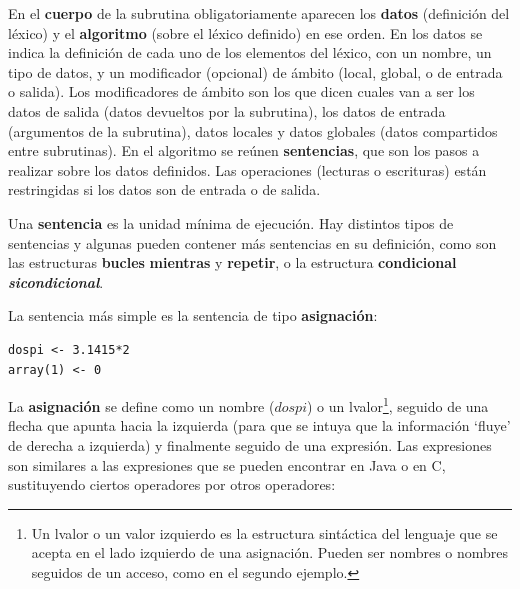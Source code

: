 \documentclass{report}
\begin{document}
	En el \textbf{cuerpo} de la subrutina obligatoriamente aparecen los \textbf{datos} (definición del léxico) y el \textbf{algoritmo} (sobre el léxico definido) en ese orden. En los datos se indica la definición de cada uno de los elementos del léxico, con un nombre, un tipo de datos, y un modificador (opcional) de ámbito (local, global, o de entrada o salida). Los modificadores de ámbito son los que dicen cuales van a ser los datos de salida (datos devueltos por la subrutina), los datos de entrada (argumentos de la subrutina), datos locales y datos globales (datos compartidos entre subrutinas). En el algoritmo se reúnen \textbf{sentencias}, que son los pasos a realizar sobre los datos definidos. Las operaciones (lecturas o escrituras) están restringidas si los datos son de entrada o de salida.   
	
	\vspace{10px}
	
	Una \textbf{sentencia} es la unidad mínima de ejecución. Hay distintos tipos de sentencias y algunas pueden contener más sentencias en su definición, como son las estructuras \textbf{bucles} \textbf{mientras} y \textbf{repetir}, o la estructura \textbf{condicional} \textbf{\textit{sicondicional}}. 
	
	\vspace{10px}
	
	La sentencia más simple es la sentencia de tipo \textbf{asignación}:
	
	\vspace{10px}
	
\begin{BVerbatim}
dospi <- 3.1415*2
array(1) <- 0
\end{BVerbatim}
	
	\vspace{10px}
	
	La \textbf{asignación} se define como un nombre ($dospi$) o un lvalor\footnote{Un lvalor o un valor izquierdo es la estructura sintáctica del lenguaje que se acepta en el lado izquierdo de una asignación. Pueden ser nombres o nombres seguidos de un acceso, como en el segundo ejemplo.}, seguido de una flecha que apunta hacia la izquierda (para que se intuya que la información `fluye' de derecha a izquierda) y finalmente seguido de una expresión. Las expresiones son similares a las expresiones que se pueden encontrar en Java o en C, sustituyendo ciertos operadores por otros operadores:
	
	\vspace{10px}
	
\end{document}
